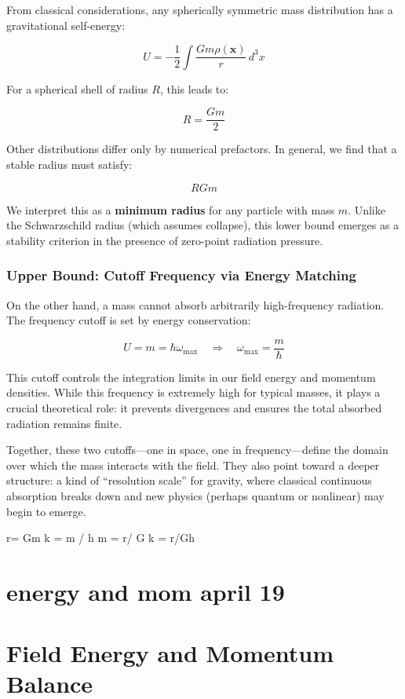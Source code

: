 \documentclass {article}
\renewcommand\vec{\mathbf}
\begin{document}
From classical considerations, any spherically symmetric mass distribution has a gravitational self-energy:

\[
U = -\frac{1}{2} \int \frac{G m \rho(\vec{x})}{r} \, d^3x
\]

For a spherical shell of radius \( R \), this leads to:

\[
R = \frac{G m}{2}
\]

Other distributions differ only by numerical prefactors. In general, we find that a stable radius must satisfy:

\[
R  G m
\]

We interpret this as a \textbf{minimum radius} for any particle with mass \( m \). Unlike the Schwarzschild radius (which assumes collapse), this lower bound emerges as a stability criterion in the presence of zero-point radiation pressure.

\subsubsection*{Upper Bound: Cutoff Frequency via Energy Matching}

On the other hand, a mass cannot absorb arbitrarily high-frequency radiation. The frequency cutoff is set by energy conservation:

\[
U = m = \hbar \omega_{\text{max}} \quad \Rightarrow \quad \omega_{\text{max}} = \frac{m}{\hbar}
\]

This cutoff controls the integration limits in our field energy and momentum densities. While this frequency is extremely high for typical masses, it plays a crucial theoretical role: it prevents divergences and ensures the total absorbed radiation remains finite.

\vspace{0.5em}
Together, these two cutoffs—one in space, one in frequency—define the domain over which the mass interacts with the field. They also point toward a deeper structure: a kind of ``resolution scale'' for gravity, where classical continuous absorption breaks down and new physics (perhaps quantum or nonlinear) may begin to emerge.


r= Gm
k = m / h
m = r/ G
k = r/Gh

\newpage

\section{energy and mom april 19}
\section{Field Energy and Momentum Balance}
\end{document}
